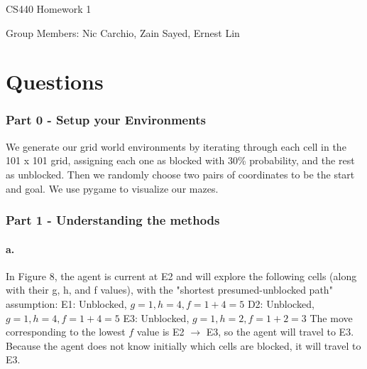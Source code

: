 \documentclass[10pt,a4paper]{article}
\begin{document}
\begin{center}
{\Huge CS440 Homework 1}

Group Members: Nic Carchio, Zain Sayed, Ernest Lin
\end{center}
\part*{Questions}

\section*{Part 0 - Setup your Environments}
We generate our grid world environments by iterating through each cell in the 101 x 101 grid, assigning each one as blocked with 30\% probability, and the rest as unblocked. Then we randomly choose two pairs of coordinates to be the start and goal. We use pygame to visualize our mazes.
\section*{Part 1 - Understanding the methods}
\subsection*{a.}
In Figure 8, the agent is current at E2 and will explore the following cells (along with their g, h, and f values), with the "shortest presumed-unblocked path" assumption:
\newline\newline
E1: Unblocked, $g = 1, h = 4, f = 1 + 4 = 5$
\newline
D2: Unblocked, $g = 1, h = 4, f = 1 + 4 = 5$
\newline
E3: Unblocked, $g = 1, h = 2, f = 1 + 2 = 3$
\newline\newline
The move corresponding to the lowest $f$ value is E2 $\rightarrow$ E3, so the agent will travel to E3. Because the agent does not know initially which cells are blocked, it will travel to E3.
\end{document}
